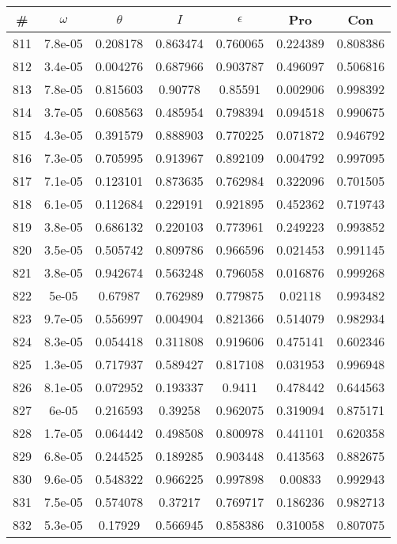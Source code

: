 \newpage
\begin{table}
\begin{tabular}{c|c|c|c|c|c|c}
\# & $\omega$ & $\theta$ & $I$ & $\epsilon$ & Pro & Con\\
\hline
811 & 7.8e-05 & 0.208178 & 0.863474 & 0.760065 & 0.224389 & 0.808386\\
812 & 3.4e-05 & 0.004276 & 0.687966 & 0.903787 & 0.496097 & 0.506816\\
813 & 7.8e-05 & 0.815603 & 0.90778 & 0.85591 & 0.002906 & 0.998392\\
814 & 3.7e-05 & 0.608563 & 0.485954 & 0.798394 & 0.094518 & 0.990675\\
815 & 4.3e-05 & 0.391579 & 0.888903 & 0.770225 & 0.071872 & 0.946792\\
816 & 7.3e-05 & 0.705995 & 0.913967 & 0.892109 & 0.004792 & 0.997095\\
817 & 7.1e-05 & 0.123101 & 0.873635 & 0.762984 & 0.322096 & 0.701505\\
818 & 6.1e-05 & 0.112684 & 0.229191 & 0.921895 & 0.452362 & 0.719743\\
819 & 3.8e-05 & 0.686132 & 0.220103 & 0.773961 & 0.249223 & 0.993852\\
820 & 3.5e-05 & 0.505742 & 0.809786 & 0.966596 & 0.021453 & 0.991145\\
821 & 3.8e-05 & 0.942674 & 0.563248 & 0.796058 & 0.016876 & 0.999268\\
822 & 5e-05 & 0.67987 & 0.762989 & 0.779875 & 0.02118 & 0.993482\\
823 & 9.7e-05 & 0.556997 & 0.004904 & 0.821366 & 0.514079 & 0.982934\\
824 & 8.3e-05 & 0.054418 & 0.311808 & 0.919606 & 0.475141 & 0.602346\\
825 & 1.3e-05 & 0.717937 & 0.589427 & 0.817108 & 0.031953 & 0.996948\\
826 & 8.1e-05 & 0.072952 & 0.193337 & 0.9411 & 0.478442 & 0.644563\\
827 & 6e-05 & 0.216593 & 0.39258 & 0.962075 & 0.319094 & 0.875171\\
828 & 1.7e-05 & 0.064442 & 0.498508 & 0.800978 & 0.441101 & 0.620358\\
829 & 6.8e-05 & 0.244525 & 0.189285 & 0.903448 & 0.413563 & 0.882675\\
830 & 9.6e-05 & 0.548322 & 0.966225 & 0.997898 & 0.00833 & 0.992943\\
831 & 7.5e-05 & 0.574078 & 0.37217 & 0.769717 & 0.186236 & 0.982713\\
832 & 5.3e-05 & 0.17929 & 0.566945 & 0.858386 & 0.310058 & 0.807075\\

\end{tabular}
\end{table}
